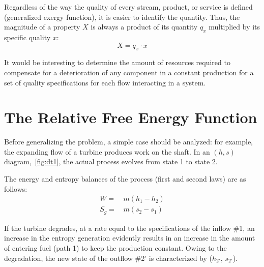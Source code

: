 \documentclass[energies,article,submit,moreauthors,pdftex]{Definitions/mdpi}
\begin{document}
Regardless of the way the quality of every stream, product, or service is defined (generalized exergy function), it is easier to identify the quantity. Thus, the magnitude of a property $X$ is always a product of its quantity $q_x$ multiplied by its specific quality $x$:
\begin{equation}
X=q_x\cdot x
\end{equation}

It would be interesting to determine the amount of resources required to compensate for a deterioration of any component in a constant production for a set of quality specifications for each flow interacting in a system.

\section{The Relative Free Energy Function}
Before generalizing the problem, a simple case should be analyzed: for example, the expanding flow of a turbine produces work on the shaft. In an $(h, s)$ diagram,~\cref{fig:dt1}, the actual process evolves from state 1 to state 2.

The energy and entropy balances of the process (first and second laws) are as follows:
\begin{align}
W=&\,m\left(h_1-h_2\right)\\
S_g=&\,m\left(s_2-s_1\right)
\end{align}

If the turbine degrades, at a rate equal to the specifications of the inflow \#1, an increase in the entropy generation evidently results in an increase in the amount of entering fuel (path 1) to keep the production constant. Owing to the degradation, the new state of the outflow \#2' is characterized by  ($h_{2'}$, $s_{2'}$).
\end{document}
